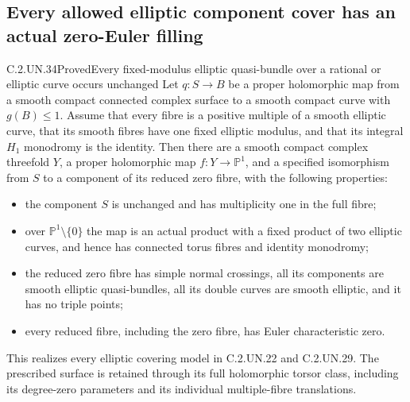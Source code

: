 \subsection{Every allowed elliptic component cover has an actual zero-Euler filling}

\begin{statement}{C.2.UN.34}{Proved}{Every fixed-modulus elliptic quasi-bundle over a rational or elliptic curve occurs unchanged}
Let $q:S\to B$ be a proper holomorphic map from a
smooth compact connected complex surface to a smooth
compact curve with $g(B)\le1$. Assume that every
fibre is a positive multiple of a smooth elliptic
curve, that its smooth fibres have one fixed elliptic
modulus, and that its integral $H_1$ monodromy is
the identity. Then there are a smooth compact complex
threefold $Y$, a proper holomorphic map
$f:Y\to\mathbb P^1$, and a specified isomorphism
from $S$ to a component of its reduced zero fibre,
with the following properties:

\begin{itemize}
\item the component $S$ is unchanged and has
multiplicity one in the full fibre;
\item over $\mathbb P^1\setminus\{0\}$ the map
is an actual product with a fixed product of two
elliptic curves, and hence has connected torus
fibres and identity monodromy;
\item the reduced zero fibre has simple normal
crossings, all its components are smooth elliptic
quasi-bundles, all its double curves are smooth
elliptic, and it has no triple points;
\item every reduced fibre, including the zero
fibre, has Euler characteristic zero.
\end{itemize}
This realizes every elliptic covering model in
C.2.UN.22 and C.2.UN.29. The prescribed surface
is retained through its full holomorphic torsor
class, including its degree-zero parameters and
its individual multiple-fibre translations.
\end{statement}

